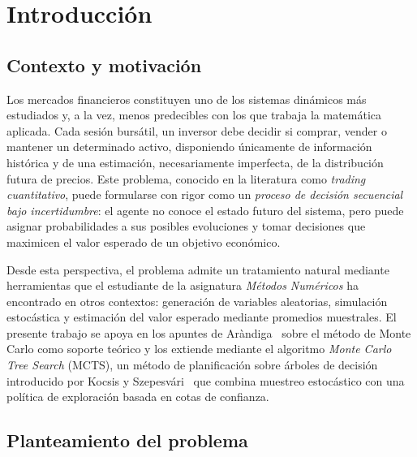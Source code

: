 \section{Introducción}
\label{sec:introduccion}

\subsection{Contexto y motivación}
\label{subsec:contexto}

Los mercados financieros constituyen uno de los sistemas dinámicos más estudiados y, a la vez, menos predecibles con los que trabaja la matemática aplicada. Cada sesión bursátil, un inversor debe decidir si comprar, vender o mantener un determinado activo, disponiendo únicamente de información histórica y de una estimación, necesariamente imperfecta, de la distribución futura de precios. Este problema, conocido en la literatura como \emph{trading cuantitativo}, puede formularse con rigor como un \emph{proceso de decisión secuencial bajo incertidumbre}: el agente no conoce el estado futuro del sistema, pero puede asignar probabilidades a sus posibles evoluciones y tomar decisiones que maximicen el valor esperado de un objetivo económico.

Desde esta perspectiva, el problema admite un tratamiento natural mediante herramientas que el estudiante de la asignatura \emph{Métodos Numéricos} ha encontrado en otros contextos: generación de variables aleatorias, simulación estocástica y estimación del valor esperado mediante promedios muestrales. El presente trabajo se apoya en los apuntes de Aràndiga~\cite{arandiga} sobre el método de Monte Carlo como soporte teórico y los extiende mediante el algoritmo \emph{Monte Carlo Tree Search} (MCTS), un método de planificación sobre árboles de decisión introducido por Kocsis y Szepesvári~\cite{kocsis2006} que combina muestreo estocástico con una política de exploración basada en cotas de confianza.

\subsection{Planteamiento del problema}
\label{subsec:problema}

